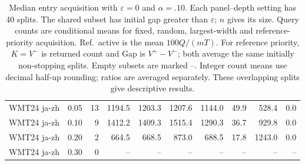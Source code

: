\begin{table}[t]
\begin{tabular}{llrrrrrrrr}
WMT24 ja-zh & 0.05 & 13 & 1194.5 & 1203.3 & 1207.6 & 1144.0 & 49.9 & 528.4 & 0.0 \\
WMT24 ja-zh & 0.10 & 9 & 1412.2 & 1409.3 & 1515.4 & 1290.3 & 36.7 & 929.8 & 0.0 \\
WMT24 ja-zh & 0.20 & 2 & 664.5 & 668.5 & 873.0 & 688.5 & 17.8 & 1243.0 & 0.0 \\
WMT24 ja-zh & 0.30 & 0 & -- & -- & -- & -- & -- & -- & -- \\
\bottomrule
\end{tabular}
\caption{Median entry acquisition with $\varepsilon=0$ and $\alpha=.10$. Each panel--depth setting has 40 splits. The shared subset has initial gap greater than $\varepsilon$; $n$ gives its size. Query counts are conditional means for fixed, random, largest-width and reference-priority acquisition. Ref.\ active is the mean $100Q/(mT)$. For reference priority, $K=V^-$ is returned count and Gap is $V^+-V^-$; both average the same initially non-stopping splits. Empty subsets are marked --. Integer count means use decimal half-up rounding; ratios are averaged separately. These overlapping splits give descriptive results.}
\label{tab:nontrivial-median-exact}
\end{table}
